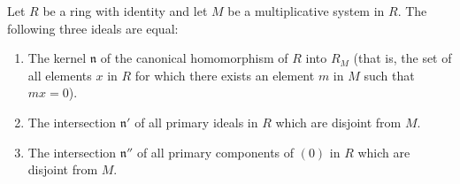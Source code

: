 Let $R$ be a ring with identity and let $M$ be a multiplicative system in $R$. The following three ideals are equal:

\begin{enumerate}
\item[1)] The kernel $\mathfrak{n}$ of the canonical homomorphism of $R$ into $R_M$ (that is, the set of all elements $x$ in $R$ for which there exists an element $m$ in $M$ such that $mx = 0$).
\item[2)] The intersection $\mathfrak{n}'$ of all primary ideals in $R$ which are disjoint from $M$.
\item[3)] The intersection $\mathfrak{n}''$ of all primary components of $(0)$ in $R$ which are disjoint from $M$.
\end{enumerate}

